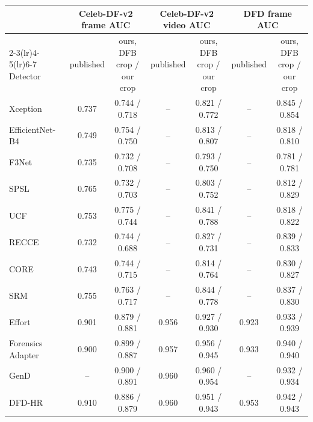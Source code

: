 \begin{tabular}{@{}l cc cc cc@{}}
\toprule
 & \multicolumn{2}{c}{Celeb-DF-v2 frame AUC} & \multicolumn{2}{c}{Celeb-DF-v2 video AUC} & \multicolumn{2}{c}{DFD frame AUC} \\
\cmidrule(lr){2-3}\cmidrule(lr){4-5}\cmidrule(lr){6-7}
Detector & published & ours, DFB crop / our crop & published & ours, DFB crop / our crop & published & ours, DFB crop / our crop \\
\midrule
Xception~\cite{xception} & 0.737 & 0.744 / 0.718 & -- & 0.821 / 0.772 & -- & 0.845 / 0.854 \\
EfficientNet-B4~\cite{efficientnet} & 0.749 & 0.754 / 0.750 & -- & 0.813 / 0.807 & -- & 0.818 / 0.810 \\
F3Net~\cite{f3net} & 0.735 & 0.732 / 0.708 & -- & 0.793 / 0.750 & -- & 0.781 / 0.781 \\
SPSL~\cite{spsl} & 0.765 & 0.732 / 0.703 & -- & 0.803 / 0.752 & -- & 0.812 / 0.829 \\
UCF~\cite{ucf} & 0.753 & 0.775 / 0.744 & -- & 0.841 / 0.788 & -- & 0.818 / 0.822 \\
RECCE~\cite{recce} & 0.732 & 0.744 / 0.688 & -- & 0.827 / 0.731 & -- & 0.839 / 0.833 \\
CORE~\cite{core} & 0.743 & 0.744 / 0.715 & -- & 0.814 / 0.764 & -- & 0.830 / 0.827 \\
SRM~\cite{srm} & 0.755 & 0.763 / 0.717 & -- & 0.844 / 0.778 & -- & 0.837 / 0.830 \\
Effort~\cite{effort} & 0.901 & 0.879 / 0.881 & 0.956 & 0.927 / 0.930 & 0.923 & 0.933 / 0.939 \\
Forensics Adapter~\cite{forensicsadapter} & 0.900 & 0.899 / 0.887 & 0.957 & 0.956 / 0.945 & 0.933 & 0.940 / 0.940 \\
GenD~\cite{gend2026} & -- & 0.900 / 0.891 & 0.960 & 0.960 / 0.954 & -- & 0.932 / 0.934 \\
DFD-HR~\cite{dfdhr2026} & 0.910 & 0.886 / 0.879 & 0.960 & 0.951 / 0.943 & 0.953 & 0.942 / 0.943 \\
\bottomrule
\end{tabular}
